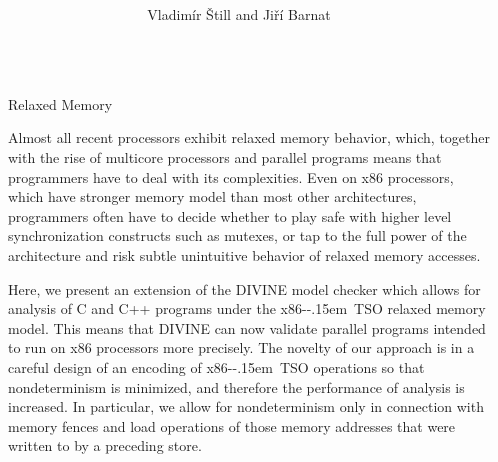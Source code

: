 \documentclass[final, 20pt, a0]{beamer}
\title{%
  \texorpdfstring{%
    \makebox[\linewidth]{%
      \noindent\hspace*{0.5em} %
      \begin{minipage}{\logowidth}%
          \texttt{[image: mu\_logo.pdf]} %
      \end{minipage}%
      \hfill %
      \begin{minipage}{\linewidth - \logowidth - \logowidth - 3em}\center\titletext\end{minipage} %
      \hfill %
      \begin{minipage}{\logowidth}%
         \texttt{[image: fi\_logo.pdf]} %
      \end{minipage}
      \hspace*{0.5em}%
    }%
  }
  {\titletext}} %
\author{Vladimír Štill and Jiří Barnat} %
\institute{Faculty of Informatics, Masaryk University\vspace*{-2cm}} %
\newlength{\marginwid}
\newlength{\onecolwid}
\newcommand{\xtso}{\mbox{x86-\kern-.15em TSO}\xspace}
\newcommand{\divine}{\mbox{DIVINE}\xspace}
\begin{document}

\setlength{\belowcaptionskip}{2ex} %
\setlength\belowdisplayshortskip{2ex} %

\begin{frame}[t] %

\begin{columns}[t] %

\begin{column}{\marginwid}\end{column} %
\begin{column}{\onecolwid} %

\begin{block}{Relaxed Memory}

Almost all recent processors exhibit relaxed memory behavior, which, together with the rise of multicore processors and parallel programs means that programmers have to deal with its complexities.
Even on x86 processors, which have stronger memory model than most other architectures, programmers often have to decide whether to play safe with higher level synchronization constructs such as mutexes, or tap to the full power of the architecture and risk subtle unintuitive behavior of relaxed memory accesses.

Here, we present an extension of the \divine model checker which allows for analysis of C and C++ programs under the \xtso relaxed memory model.
This means that \divine can now validate parallel programs intended to run on x86 processors more precisely.
The novelty of our approach is in a careful design of an encoding of \xtso operations so that nondeterminism is minimized, and therefore the performance of analysis is increased.
In particular, we allow for nondeterminism only in connection with memory fences and load operations of those memory addresses that were written to by a preceding store.

\end{block}

\end{column} %


\end{columns}
\end{frame}
\end{document}
